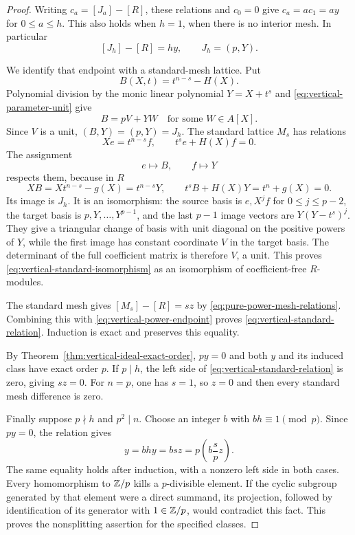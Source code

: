 \begin{proof}
Writing $c_a=[J_a]-[R]$, these relations and $c_0=0$ give
$c_a=a c_1=a y$ for $0\leq a\leq h$.  This also holds when
$h=1$, when there is no interior mesh.  In particular
\begin{equation}\label{eq:vertical-power-endpoint}
 [J_h]-[R]=h y,\qquad J_h=(p,Y).
\end{equation}

We identify that endpoint with a standard-mesh lattice.  Put
\[
 B(X,t)=t^{n-s}-H(X).
\]
Polynomial division by the monic linear polynomial $Y=X+t^s$
and \eqref{eq:vertical-parameter-unit} give
\[
 B=pV+YW\quad\text{for some }W\in A[X].
\]
Since $V$ is a unit, $(B,Y)=(p,Y)=J_h$.
The standard lattice $M_s$ has relations
\[
 Xe=t^{n-s}f,\qquad t^se+H(X)f=0.
\]
The assignment
\begin{equation}\label{eq:vertical-standard-isomorphism}
 e\longmapsto B,\qquad f\longmapsto Y
\end{equation}
respects them, because in $R$
\[
 XB=Xt^{n-s}-g(X)=t^{n-s}Y,\qquad
 t^sB+H(X)Y=t^n+g(X)=0.
\]
Its image is $J_h$.  It is an isomorphism: the source basis is
$e,X^jf$ for $0\leq j\leq p-2$, the target basis is
$p,Y,\ldots,Y^{p-1}$, and the last $p-1$ image vectors are
$Y(Y-t^s)^j$.  They give a triangular change of basis with
unit diagonal on the positive powers of $Y$, while the first
image has constant coordinate $V$ in the target basis.
The determinant of the full coefficient matrix is therefore $V$,
a unit.  This proves \eqref{eq:vertical-standard-isomorphism}
as an isomorphism of coefficient-free $R$-modules.

The standard mesh gives $[M_s]-[R]=s z$ by
\eqref{eq:pure-power-mesh-relations}.  Combining this with
\eqref{eq:vertical-power-endpoint} proves
\eqref{eq:vertical-standard-relation}.  Induction is exact and
preserves this equality.

By Theorem~\ref{thm:vertical-ideal-exact-order}, $py=0$ and
both $y$ and its induced class have exact order $p$.
If $p\mid h$, the left side of
\eqref{eq:vertical-standard-relation} is zero, giving $s z=0$.
For $n=p$, one has $s=1$, so $z=0$ and then every standard
mesh difference is zero.

Finally suppose $p\nmid h$ and $p^2\mid n$.  Choose an integer
$b$ with $bh\equiv1\pmod p$.  Since $py=0$, the relation gives
\[
 y=bh y=bs z
    =p\left(b\frac{s}{p}z\right).
\]
The same equality holds after induction, with a nonzero left side
in both cases.  Every homomorphism to $\mathbb Z/p$ kills a
$p$-divisible element.  If the cyclic subgroup generated by
that element were a direct summand, its projection, followed by
identification of its generator with $1\in\mathbb Z/p$, would contradict
this fact.  This proves the nonsplitting assertion for the specified
classes.
\end{proof}


